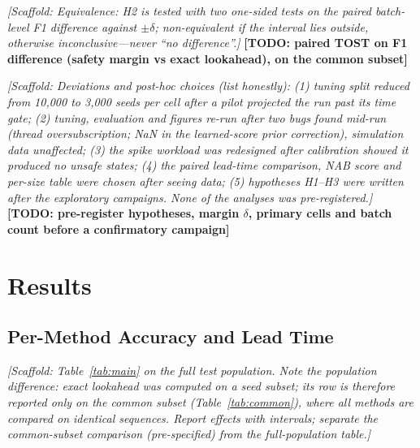 \documentclass[conference]{IEEEtran}
\newcommand{\scaffold}[1]{\textcolor{blue!60!black}{\textit{[Scaffold: #1]}}}
\newcommand{\todo}[1]{\textcolor{red!70!black}{\textbf{[TODO: #1]}}}
\begin{document}
\scaffold{Equivalence: H2 is tested with two one-sided tests on the paired batch-level F1 difference against $\pm\delta$; non-equivalent if the interval lies outside, otherwise inconclusive---never ``no difference''.} \todo{paired TOST on F1 difference (safety margin vs exact lookahead), on the common subset}

\scaffold{Deviations and post-hoc choices (list honestly): (1) tuning split reduced from 10,000 to 3,000 seeds per cell after a pilot projected the run past its time gate; (2) tuning, evaluation and figures re-run after two bugs found mid-run (thread oversubscription; NaN in the learned-score prior correction), simulation data unaffected; (3) the spike workload was redesigned after calibration showed it produced no unsafe states; (4) the paired lead-time comparison, NAB score and per-size table were chosen after seeing data; (5) hypotheses H1--H3 were written after the exploratory campaigns. None of the analyses was pre-registered.} \todo{pre-register hypotheses, margin $\delta$, primary cells and batch count before a confirmatory campaign}

\section{Results}\label{sec:results}

\subsection{Per-Method Accuracy and Lead Time}\label{sec:res-accuracy}
\scaffold{Table~\ref{tab:main} on the full test population. Note the population difference: exact lookahead was computed on a seed subset; its row is therefore reported only on the common subset (Table~\ref{tab:common}), where all methods are compared on identical sequences. Report effects with intervals; separate the common-subset comparison (pre-specified) from the full-population table.}
\end{document}
